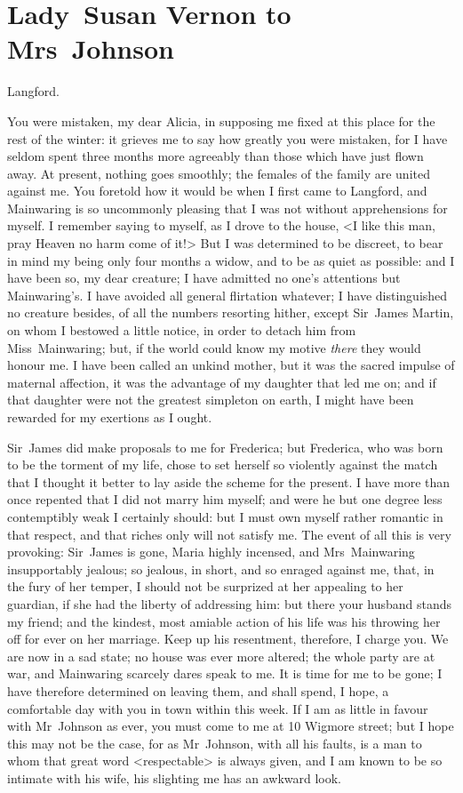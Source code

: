 \chapter{Lady~Susan Vernon to Mrs~Johnson}
	
	\begin{mail}{Langford.}{}
  
You were mistaken, my dear Alicia, in supposing me fixed at this place for the rest of the winter: it grieves me to say how greatly you were mistaken, for I have seldom spent three months more agreeably than those which have just flown away. At present, nothing goes smoothly; the females of the family are united against me. You foretold how it would be when I first came to Langford, and Mainwaring is so uncommonly pleasing that I was not without apprehensions for myself. I remember saying to myself, as I drove to the house, <I like this man, pray Heaven no harm come of it!> But I was determined to be discreet, to bear in mind my being only four months a widow, and to be as quiet as possible: and I have been so, my dear creature; I have admitted no one's attentions but Mainwaring's. I have avoided all general flirtation whatever; I have distinguished no creature besides, of all the numbers resorting hither, except Sir~James Martin, on whom I bestowed a little notice, in order to detach him from Miss~Mainwaring; but, if the world could know my motive \textit{there} they would honour me. I have been called an unkind mother, but it was the sacred impulse of maternal affection, it was the advantage of my daughter that led me on; and if that daughter were not the greatest simpleton on earth, I might have been rewarded for my exertions as I ought.

Sir~James did make proposals to me for Frederica; but Frederica, who was born to be the torment of my life, chose to set herself so violently against the match that I thought it better to lay aside the scheme for the present. I have more than once repented that I did not marry him myself; and were he but one degree less contemptibly weak I certainly should: but I must own myself rather romantic in that respect, and that riches only will not satisfy me. The event of all this is very provoking: Sir~James is gone, Maria highly incensed, and Mrs~Mainwaring insupportably jealous; so jealous, in short, and so enraged against me, that, in the fury of her temper, I should not be surprized at her appealing to her guardian, if she had the liberty of addressing him: but there your husband stands my friend; and the kindest, most amiable action of his life was his throwing her off for ever on her marriage. Keep up his resentment, therefore, I charge you. We are now in a sad state; no house was ever more altered; the whole party are at war, and Mainwaring scarcely dares speak to me. It is time for me to be gone; I have therefore determined on leaving them, and shall spend, I hope, a comfortable day with you in town within this week. If I am as little in favour with Mr~Johnson as ever, you must come to me at 10 Wigmore street; but I hope this may not be the case, for as Mr~Johnson, with all his faults, is a man to whom that great word <respectable> is always given, and I am known to be so intimate with his wife, his slighting me has an awkward look.


\end{mail}
